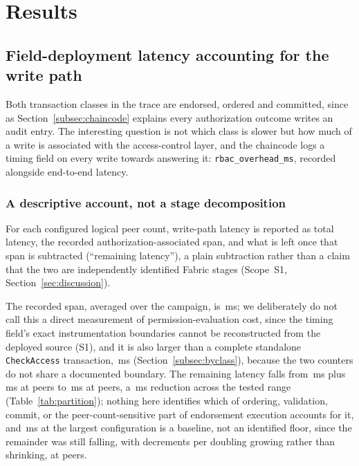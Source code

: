 \documentclass[a4paper,fleqn]{cas-dc}
\begin{document}
\FloatBarrier
\section{Results}
\label{sec:results}

\subsection{Field-deployment latency accounting for the write path}
\label{subsec:decomposition}

Both transaction classes in the trace are endorsed, ordered and committed,
since as Section~\ref{subsec:chaincode} explains every authorization outcome
writes an audit entry. The interesting question is not which class is
slower but how much of a write is associated with the access-control layer,
and the chaincode logs a timing field on every write towards answering it:
\texttt{rbac\_overhead\_ms}, recorded alongside end-to-end latency.

\subsubsection{A descriptive account, not a stage decomposition}
\label{subsubsec:partition}

For each configured logical peer count, write-path latency is reported as
total latency, the recorded authorization-associated span, and what is
left once that span is subtracted (``remaining latency''), a plain
subtraction rather than a claim that the two are independently identified
Fabric stages (Scope~S1, Section~\ref{sec:discussion}).

The recorded span, averaged over the campaign, is \PartAccess\,ms; we
deliberately do not call this a direct measurement of permission-evaluation
cost, since the timing field's exact instrumentation boundaries cannot be
reconstructed from the deployed source (S1), and it is also larger than a
complete standalone \texttt{CheckAccess} transaction, \DecisionMean\,ms
(Section~\ref{subsec:byclass}), because the two counters do not share a
documented boundary. The remaining latency falls from \PartRemainder\,ms
plus \PartEndorser\,ms at \ScaleMinPeers{} peers to \PartRemainder\,ms at
\ScaleMaxPeers{} peers, a \PartEndorser\,ms reduction across the tested
range (Table~\ref{tab:partition}); nothing here identifies which of
ordering, validation, commit, or the peer-count-sensitive part of
endorsement execution accounts for it, and \PartRemainder\,ms at the
largest configuration is a baseline, not an identified floor, since the
remainder was still falling, with decrements per doubling growing rather
than shrinking, at \ScaleMaxPeers{} peers.
\end{document}
